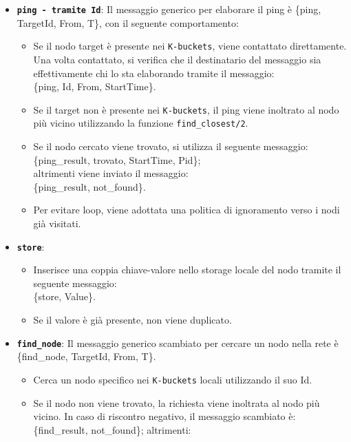 \documentclass{article}
\begin{document}
\begin{itemize}
    \item \textbf{\texttt{ping - tramite Id}}:  
    Il messaggio generico per elaborare il ping è \{ping, TargetId, From, T\}, con il seguente comportamento:
    \begin{itemize}
        \item Se il nodo target è presente nei \texttt{K-buckets}, viene contattato direttamente. Una volta contattato, si verifica che il destinatario del messaggio sia effettivamente chi lo sta elaborando tramite il messaggio:\\ \{ping, Id, From, StartTime\}.
        \item Se il target non è presente nei \texttt{K-buckets}, il ping viene inoltrato al nodo più vicino utilizzando la funzione \texttt{find\_closest/2}.
        \item Se il nodo cercato viene trovato, si utilizza il seguente messaggio:\\ \{ping\_result, trovato, StartTime, Pid\};\\ altrimenti viene inviato il messaggio:\\
        \{ping\_result, not\_found\}.
        \item Per evitare loop, viene adottata una politica di ignoramento verso i nodi già visitati.
    \end{itemize}
    \item \textbf{\texttt{store}}:
    \begin{itemize}
        \item Inserisce una coppia chiave-valore nello storage locale del nodo tramite il seguente messaggio:\\ \{store, Value\}.
        \item Se il valore è già presente, non viene duplicato.
    \end{itemize}
    \item \textbf{\texttt{find\_node}}:  
    Il messaggio generico scambiato per cercare un nodo nella rete è\\
    \{find\_node, TargetId, From, T\}.
    \begin{itemize}
        \item Cerca un nodo specifico nei \texttt{K-buckets} locali utilizzando il suo Id.
        \item Se il nodo non viene trovato, la richiesta viene inoltrata al nodo più vicino. In caso di riscontro negativo, il messaggio scambiato è:\\
        \{find\_result, not\_found\}; altrimenti:\\

\end{itemize}
\end{itemize}
\end{document}
